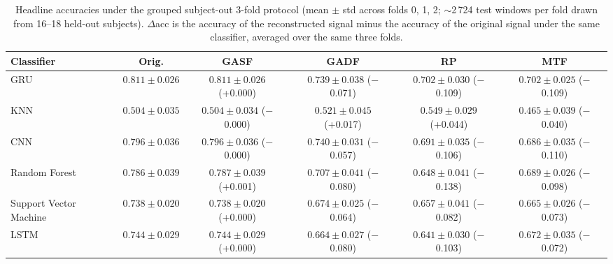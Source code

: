 \begin{table}[H]
\centering
\caption{Headline accuracies under the grouped subject-out 3-fold protocol (mean $\pm$ std across folds 0, 1, 2; $\sim$2\,724 test windows per fold drawn from 16--18 held-out subjects). $\Delta$acc is the accuracy of the reconstructed signal minus the accuracy of the original signal under the same classifier, averaged over the same three folds.}
\label{tab:gadf_summary_loso}
\setlength{\tabcolsep}{3pt}
\footnotesize
\begin{tabular}{lccccc}
\toprule
\textbf{Classifier} & \textbf{Orig.} & \textbf{GASF} & \textbf{GADF} & \textbf{RP} & \textbf{MTF} \\
\midrule
GRU & $0.811 \pm 0.026$ & $0.811 \pm 0.026$ (+0.000) & $0.739 \pm 0.038$ ($-$0.071) & $0.702 \pm 0.030$ ($-$0.109) & $0.702 \pm 0.025$ ($-$0.109) \\
KNN & $0.504 \pm 0.035$ & $0.504 \pm 0.034$ ($-$0.000) & $0.521 \pm 0.045$ (+0.017) & $0.549 \pm 0.029$ (+0.044) & $0.465 \pm 0.039$ ($-$0.040) \\
CNN & $0.796 \pm 0.036$ & $0.796 \pm 0.036$ ($-$0.000) & $0.740 \pm 0.031$ ($-$0.057) & $0.691 \pm 0.035$ ($-$0.106) & $0.686 \pm 0.035$ ($-$0.110) \\
Random Forest & $0.786 \pm 0.039$ & $0.787 \pm 0.039$ (+0.001) & $0.707 \pm 0.041$ ($-$0.080) & $0.648 \pm 0.041$ ($-$0.138) & $0.689 \pm 0.026$ ($-$0.098) \\
Support Vector Machine & $0.738 \pm 0.020$ & $0.738 \pm 0.020$ (+0.000) & $0.674 \pm 0.025$ ($-$0.064) & $0.657 \pm 0.041$ ($-$0.082) & $0.665 \pm 0.026$ ($-$0.073) \\
LSTM & $0.744 \pm 0.029$ & $0.744 \pm 0.029$ (+0.000) & $0.664 \pm 0.027$ ($-$0.080) & $0.641 \pm 0.030$ ($-$0.103) & $0.672 \pm 0.035$ ($-$0.072) \\

\bottomrule
\end{tabular}
\end{table}

